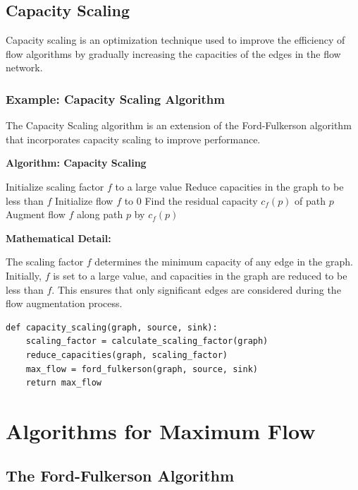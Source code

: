 \documentclass[12pt]{book} %
\begin{document}
\subsection{Capacity Scaling}

Capacity scaling is an optimization technique used to improve the efficiency of flow algorithms by gradually increasing the capacities of the edges in the flow network.

\subsubsection{Example: Capacity Scaling Algorithm}

The Capacity Scaling algorithm is an extension of the Ford-Fulkerson algorithm that incorporates capacity scaling to improve performance.

\textbf{Algorithm: Capacity Scaling}
\FloatBarrier
\begin{algorithm}[H]
\caption{Capacity Scaling Algorithm}\label{alg:capacity-scaling}
\begin{algorithmic}[1]
\State Initialize scaling factor $f$ to a large value
\State Reduce capacities in the graph to be less than $f$
\State Initialize flow $f$ to 0
    \State Find the residual capacity $c_f(p)$ of path $p$
    \State Augment flow $f$ along path $p$ by $c_f(p)$
\EndWhile
\end{algorithmic}
\end{algorithm}
\FloatBarrier
\textbf{Mathematical Detail:}

The scaling factor $f$ determines the minimum capacity of any edge in the graph. Initially, $f$ is set to a large value, and capacities in the graph are reduced to be less than $f$. This ensures that only significant edges are considered during the flow augmentation process.

\FloatBarrier
\begin{lstlisting}
def capacity_scaling(graph, source, sink):
    scaling_factor = calculate_scaling_factor(graph)
    reduce_capacities(graph, scaling_factor)
    max_flow = ford_fulkerson(graph, source, sink)
    return max_flow
\end{lstlisting}
\FloatBarrier

\section{Algorithms for Maximum Flow}

\subsection{The Ford-Fulkerson Algorithm}
\end{document}
